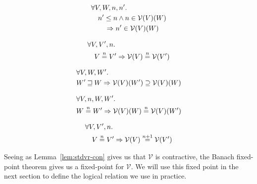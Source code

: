 \documentclass[a4paper]{article}
\newcommand{\nequal}[1][n]{\stackrel{\tiny{#1}}{=}}
\newcommand{\future}{\mathbin{\sqsupseteq}}
\newcommand{\asmType}{\plaindom{AsmType}}
\newcommand{\plaindom}[1]{\mathrm{#1}}
\newcommand{\intr}[2]{\mathcal{#1}}
\newcommand{\valueintr}[1]{\intr{V}{#1}}
\newcommand{\stdvr}{\valueintr{\asmType}}
\begin{document}
\begin{lemma}
\label{lem:stdvr-dc}
  \begin{align*}
    & \forall V, W, n, n' \ldotp \\
    & \quad n' \leq n \land n \in \stdvr(V)(W) \\
    & \qquad \Rightarrow n' \in \stdvr(V)(W)
  \end{align*}
\end{lemma}

\begin{lemma}
\label{lem:stdvr-ne-V}
  \begin{align*}
    & \forall V, V', n \ldotp \\
    & \quad V \nequal V' \Rightarrow \stdvr(V) \nequal \stdvr(V')
  \end{align*}
\end{lemma}

\begin{lemma}
\label{lem:stdvr-mono-world}
  \begin{align*}
    & \forall V, W, W' \ldotp \\
    & W' \future W \Rightarrow \stdvr(V)(W') \supseteq \stdvr(V)(W)
  \end{align*} 
\end{lemma}

\begin{lemma}
\label{lem:stdvr-ne-worlds}
  \begin{align*}
    & \forall V, n, W, W' \ldotp \\
    & W \nequal W' \Rightarrow \stdvr(V)(W) \nequal \stdvr(V)(W')
  \end{align*} 
\end{lemma}

\begin{lemma}
\label{lem:stdvr-con}
  \begin{align*}
    & \forall V, V', n \ldotp \\
    & \quad V \nequal V' \Rightarrow \stdvr(V) \nequal[n+1] \stdvr(V')
  \end{align*}
\end{lemma}

Seeing as Lemma~\ref{lem:stdvr-con} gives us that $\stdvr$ is contractive, the Banach fixed-point theorem gives us a fixed-point for $\stdvr$. We will use this fixed point in the next section to define the logical relation we use in practice.
\end{document}
